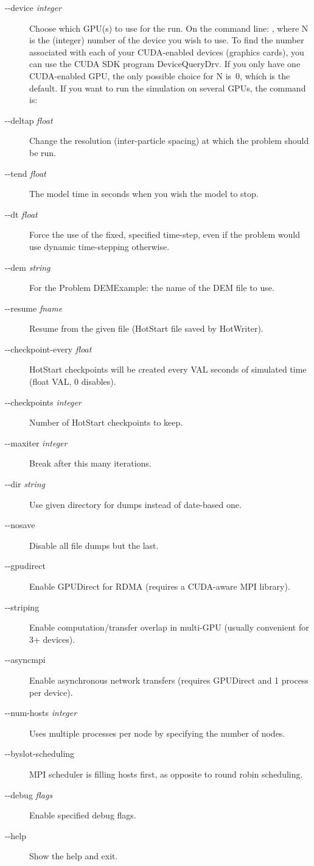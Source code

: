 \documentclass{../GPUSPHtemplate}
\begin{document}
\begin{description}
\item [-{}-device \emph{integer}]
Choose which GPU(s) to use for the run.
On the command line: , where N is the
(integer) number of the device you wish to use. 
To find the number associated with each of your CUDA-enabled 
devices (graphics cards), you
can use the CUDA SDK program DeviceQueryDrv. If you only have one
CUDA-enabled GPU, the only possible choice for N is~0, which is the
default.
If you want to run the simulation on several GPUs, the command is:
\item [-{}-deltap \emph{float}]
Change the resolution (inter-particle spacing) at which the problem
should be run.
\item [-{}-tend \emph{float}]
The model time in seconds when you wish the model to stop.
\item [-{}-dt \emph{float}]
Force the use of the fixed, specified time-step, even if the problem
would use dynamic time-stepping otherwise.
\item [-{}-dem \emph{string}]
For the Problem DEMExample: the name of the DEM file to use.
\item [-{}-resume \emph{fname}]
Resume from the given file (HotStart file saved by HotWriter).
\item [-{}-checkpoint-every \emph{float}]
HotStart checkpoints will be created every VAL seconds of simulated time (float VAL, 0 disables).
\item [-{}-checkpoints \emph{integer}]
Number of HotStart checkpoints to keep.
\item [-{}-maxiter \emph{integer}]
Break after this many iterations.
\item [-{}-dir \emph{string}]
Use given directory for dumps instead of date-based one.
\item [-{}-nosave]
Disable all file dumps but the last.
\item [-{}-gpudirect]
Enable GPUDirect for RDMA (requires a CUDA-aware MPI library).
\item [-{}-striping]
Enable computation/transfer overlap in multi-GPU (usually convenient for 3+ devices).
\item [-{}-asyncmpi]
Enable asynchronous network transfers (requires GPUDirect and 1 process per device).
\item [-{}-num-hosts \emph{integer}]
Uses multiple processes per node by specifying the number of nodes.
\item [-{}-byslot-scheduling]
MPI scheduler is filling hosts first, as opposite to round robin scheduling.
\item [-{}-debug \emph{flags}]
Enable specified debug flags.
\item [-{}-help]
Show the help and exit.
\end{description}
\end{document}
